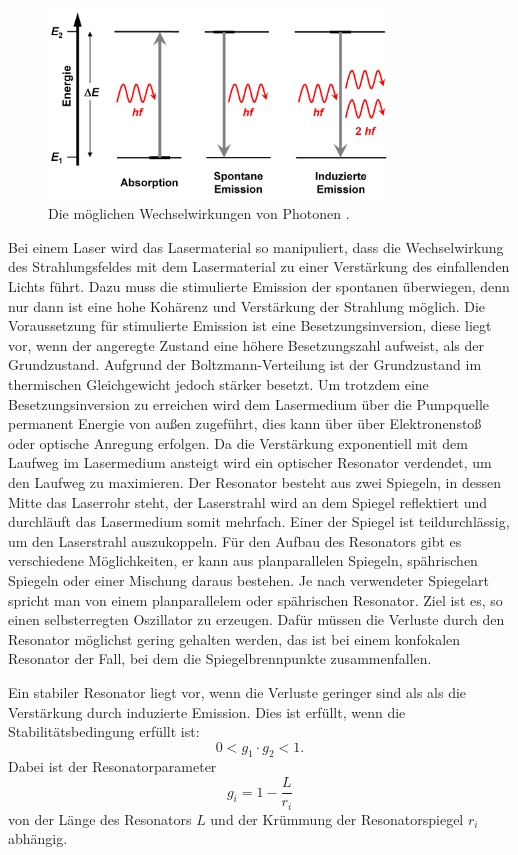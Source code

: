 \begin{figure}[H]
  \centering
  \includegraphics[width=9cm]{Emission.png}
  \caption{Die möglichen Wechselwirkungen von Photonen \cite{seos}.}
  \label{fig:Emission}
\end{figure}

Bei einem Laser wird das Lasermaterial so manipuliert, dass die Wechselwirkung des Strahlungsfeldes
mit dem Lasermaterial zu einer Verstärkung des einfallenden Lichts führt. Dazu muss die stimulierte
Emission der spontanen überwiegen, denn nur dann ist eine hohe Kohärenz und Verstärkung der Strahlung möglich.
Die Voraussetzung für stimulierte Emission ist eine Besetzungsinversion, diese liegt vor, wenn der angeregte Zustand
eine höhere Besetzungszahl aufweist, als der Grundzustand. Aufgrund der Boltzmann-Verteilung ist der Grundzustand im
thermischen Gleichgewicht jedoch stärker besetzt. Um trotzdem eine Besetzungsinversion zu erreichen wird dem
Lasermedium über die Pumpquelle permanent Energie von außen zugeführt, dies kann über über Elektronenstoß
oder optische Anregung erfolgen.
Da die Verstärkung exponentiell mit dem Laufweg im Lasermedium ansteigt wird ein optischer Resonator verdendet, um den
Laufweg zu maximieren. Der Resonator besteht aus zwei Spiegeln, in dessen Mitte das Laserrohr steht, der Laserstrahl wird an
dem Spiegel reflektiert und durchläuft das Lasermedium somit mehrfach. Einer der Spiegel ist teildurchlässig, um den Laserstrahl
auszukoppeln. Für den Aufbau des Resonators gibt es verschiedene Möglichkeiten, er kann aus planparallelen Spiegeln, spährischen
Spiegeln oder einer Mischung daraus bestehen. Je nach verwendeter Spiegelart spricht man von einem planparallelem oder spährischen
Resonator. Ziel ist es, so einen selbsterregten Oszillator zu erzeugen. Dafür müssen die Verluste durch den Resonator möglichst gering
gehalten werden, das ist bei einem konfokalen Resonator der Fall, bei dem die Spiegelbrennpunkte zusammenfallen.

Ein stabiler Resonator liegt vor, wenn die Verluste geringer sind als als die Verstärkung durch induzierte Emission.
Dies ist erfüllt, wenn die Stabilitätsbedingung erfüllt ist:
\begin{equation}
  0< g_1 \cdot g_2 <1.
\end{equation}
Dabei ist der Resonatorparameter
\begin{equation}
  g_i = 1- \frac{L}{r_i}
\end{equation}
von der Länge des Resonators $L$ und der Krümmung der Resonatorspiegel $r_i$ abhängig.

